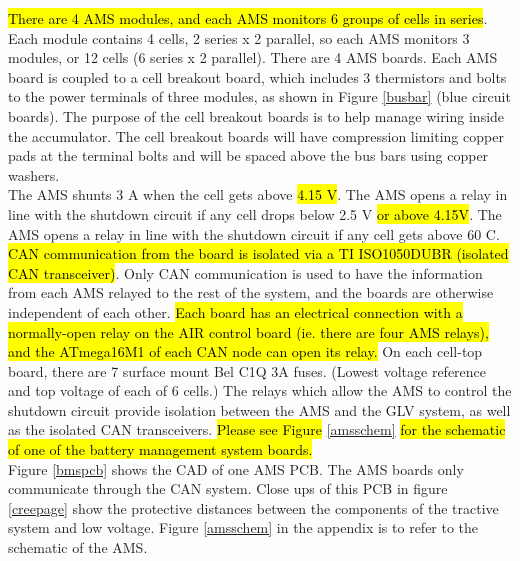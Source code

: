 \documentclass{article}
\DeclareRobustCommand{\hlr}[1]{{\sethlcolor{red}\hl{#1}}}
\begin{document}
           \hlr{There are 4 AMS modules, and each AMS monitors 6 groups of cells in series}. Each module contains 4 cells, 2 series x 2 parallel, so each AMS monitors 3 modules, or 12 cells (6 series x 2 parallel). There are 4 AMS boards. Each AMS board is coupled to a cell breakout board, which includes 3 thermistors and bolts to the power terminals of three modules, as shown in Figure \ref{busbar} (blue circuit boards). The purpose of the cell breakout boards is to help manage wiring inside the accumulator. The cell breakout boards will have compression limiting copper pads at the terminal bolts and will be spaced above the bus bars using copper washers.\\

            The AMS shunts 3 A when the cell gets above \hlr{4.15 V}. The AMS opens a relay in line with the shutdown circuit if any cell drops below 2.5 V \hlr{or above 4.15V}. The AMS opens a relay in line with the shutdown circuit if any cell gets above 60 \degree C.\\

            \hlr{CAN communication from the board is isolated via a TI ISO1050DUBR (isolated CAN transceiver)}. Only CAN communication is used to have the information from each AMS relayed to the rest of the system, and the boards are otherwise independent of each other. \hlr{Each board has an electrical connection with a normally-open relay on the AIR control board (ie. there are four AMS relays), and the ATmega16M1 of each CAN node can open its relay.} On each cell-top board, there are 7 surface mount Bel C1Q 3A fuses. (Lowest voltage reference and top voltage of each of 6 cells.) The relays which allow the AMS to control the shutdown circuit provide isolation between the AMS and the GLV system, as well as the isolated CAN transceivers. \hlr{Please see Figure} \ref{amsschem} \hlr{for the schematic of one of the battery management system boards.}\\


            Figure \ref{bmspcb} shows the CAD of one AMS PCB. The AMS boards only communicate through the CAN system. Close ups of this PCB in figure \ref{creepage} show the protective distances between the components of the tractive system and low voltage. Figure \ref{amsschem} in the appendix is to refer to the schematic of the AMS.
\end{document}
